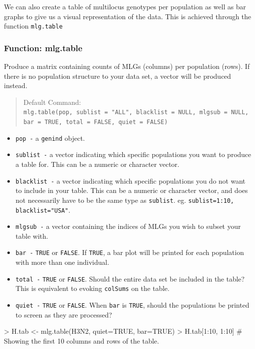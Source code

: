 \documentclass[letterpaper]{article}
\newcommand{\tab}{\hspace*{1em}}
\begin{document}
We can also create a table of multilocus genotypes per population as well as bar graphs to give us a visual representation of the data. This is achieved through the function \texttt{mlg.table}
\subsubsection{Function: mlg.table}

\tab\tab Produce a matrix containing counts of MLGs (columns) per population (rows). If there is no population structure to your data set, a vector will be produced instead.
\begin{quote}
Default Command:\\
\texttt{mlg.table(pop, sublist = "ALL", blacklist = NULL, mlgsub = NULL, bar = TRUE, total = FALSE, quiet = FALSE)}
\end{quote}
  \begin{itemize}
    \item \texttt{pop -} a \texttt{genind} object.
    \item \texttt{sublist -} a vector indicating which specific populations you want to produce a table for. This can be a numeric or character vector.
    \item \texttt{blacklist -} a vector indicating which specific populations you do not want to include in your table. This can be a numeric or character vector, and does not necessarily have to be the same type as \texttt{sublist}. eg. \texttt{sublist=1:10, blacklist="USA"}.
    \item \texttt{mlgsub -} a vector containing the indices of MLGs you wish to subset your table with. 
    \item \texttt{bar -} \texttt{TRUE} or \texttt{FALSE}. If  \texttt{TRUE}, a bar plot will be printed for each population with more than one individual. 
    \item \texttt{total -} \texttt{TRUE} or \texttt{FALSE}. Should the entire data set be included in the table? This is equivalent to evoking \texttt{colSums} on the table.
    \item \texttt{quiet -} \texttt{TRUE} or \texttt{FALSE}. When \texttt{bar} is \texttt{TRUE}, should the populations be printed to screen as they are processed?
  \end{itemize}
\begin{Schunk}
\begin{Sinput}
> H.tab <- mlg.table(H3N2, quiet=TRUE, bar=TRUE)
> H.tab[1:10, 1:10] # Showing the first 10 columns and rows of the table.
\end{Sinput}
\end{Schunk}
\end{document}
